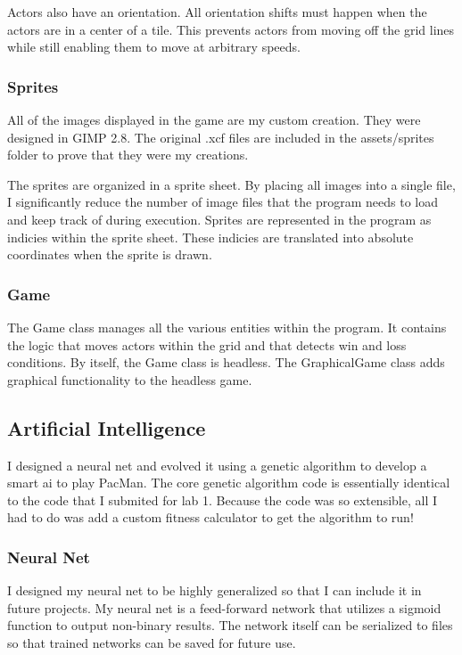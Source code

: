 \documentclass{article}
\begin{document}
Actors also have an orientation. All orientation shifts must happen when the
actors are in a center of a tile. This prevents actors from moving off the grid
lines while still enabling them to move at arbitrary speeds.

\subsubsection{Sprites}
All of the images displayed in the game are my custom creation. They were
designed in GIMP 2.8. The original .xcf files are included in the assets/sprites
folder to prove that they were my creations.

The sprites are organized in a sprite sheet. By placing all images into a single
file, I significantly reduce the number of image files that the program needs to
load and keep track of during execution. Sprites are represented in the program
as indicies within the sprite sheet. These indicies are translated into absolute
coordinates when the sprite is drawn.

\subsubsection{Game}
The Game class manages all the various entities within the program. It contains
the logic that moves actors within the grid and that detects win and loss
conditions. By itself, the Game class is headless. The GraphicalGame class
adds graphical functionality to the headless game.

\subsection{Artificial Intelligence}
I designed a neural net and evolved it using a genetic algorithm to develop a
smart ai to play PacMan. The core genetic algorithm code is essentially
identical to the code that I submited for lab 1. Because the code was so
extensible, all I had to do was add a custom fitness calculator to get the
algorithm to run!

\subsubsection{Neural Net}
I designed my neural net to be highly generalized so that I can include it in
future projects. My neural net is a feed-forward network that utilizes a sigmoid
function to output non-binary results. The network itself can be serialized to
files so that trained networks can be saved for future use.
\end{document}
